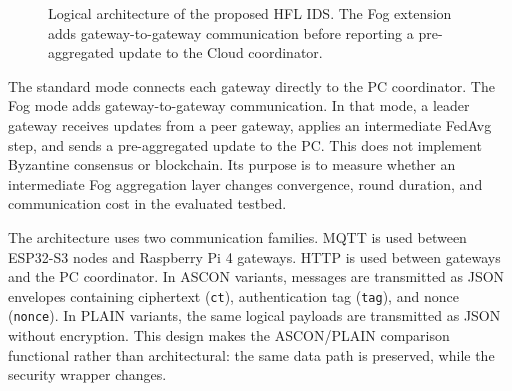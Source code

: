 \documentclass[runningheads]{llncs}
\begin{document}
\begin{figure}[t]
\centering
{}
\caption{Logical architecture of the proposed HFL IDS. The Fog extension adds gateway-to-gateway communication before reporting a pre-aggregated update to the Cloud coordinator.}
\label{fig:architecture}
\end{figure}

The standard mode connects each gateway directly to the PC coordinator. The Fog mode adds gateway-to-gateway communication. In that mode, a leader gateway receives updates from a peer gateway, applies an intermediate FedAvg step, and sends a pre-aggregated update to the PC. This does not implement Byzantine consensus or blockchain. Its purpose is to measure whether an intermediate Fog aggregation layer changes convergence, round duration, and communication cost in the evaluated testbed.

The architecture uses two communication families. MQTT is used between ESP32-S3 nodes and Raspberry Pi 4 gateways. HTTP is used between gateways and the PC coordinator. In ASCON variants, messages are transmitted as JSON envelopes containing ciphertext (\texttt{ct}), authentication tag (\texttt{tag}), and nonce (\texttt{nonce}). In PLAIN variants, the same logical payloads are transmitted as JSON without encryption. This design makes the ASCON/PLAIN comparison functional rather than architectural: the same data path is preserved, while the security wrapper changes.
\end{document}
